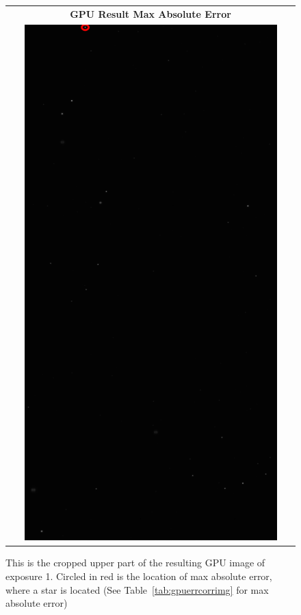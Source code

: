 \documentclass[DM,authoryear,toc]{lsstdoc}
\begin{document}
\begin{figure}[h]
\centering
  \begin{tabular}[t]{c}
    \textbf{GPU Result Max Absolute Error}\\
    \includegraphics[trim=0cm 95cm 0cm 0cm,clip=true,width=0.9\textwidth]{./figs/fig17/max_error_GPU_labeled.png}\\
  \end{tabular}
\caption{This is the cropped upper part of the resulting GPU image of exposure 1. Circled in red is the location of max absolute error,
where a star is located (See Table~\ref{tab:gpuerrcorrimg} for max absolute error)}
\label{fig:bfemaxerr}
\end{figure}
\end{document}
